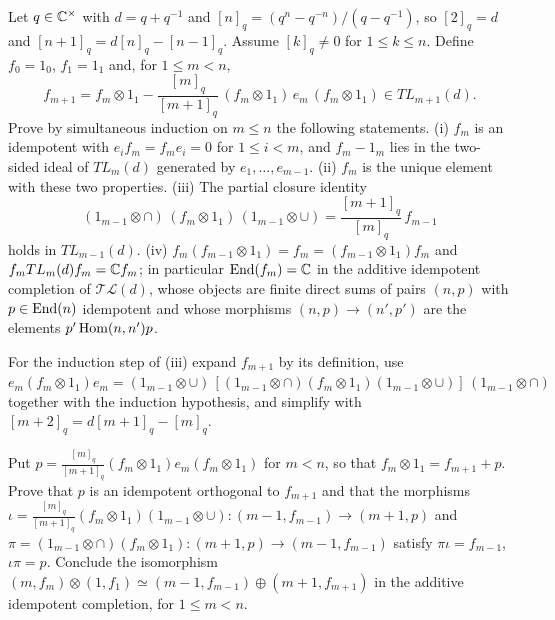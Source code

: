 \begin{exercise}
Let $q\in\mathbb C^\times$ with $d=q+q^{-1}$ and $[n]_q=(q^n-q^{-n})/(q-q^{-1})$, so $[2]_q=d$ and $[n+1]_q=d[n]_q-[n-1]_q$. Assume $[k]_q\ne0$ for $1\le k\le n$. Define $f_0=1_0$, $f_1=1_1$ and, for $1\le m<n$,
\[
f_{m+1}=f_m\otimes1_1-\frac{[m]_q}{[m+1]_q}\,(f_m\otimes1_1)\,e_m\,(f_m\otimes1_1)\in TL_{m+1}(d).
\]
Prove by simultaneous induction on $m\le n$ the following statements. (i) $f_m$ is an idempotent with $e_if_m=f_me_i=0$ for $1\le i<m$, and $f_m-1_m$ lies in the two-sided ideal of $TL_m(d)$ generated by $e_1,\dots,e_{m-1}$. (ii) $f_m$ is the unique element with these two properties. (iii) The partial closure identity
\[
(1_{m-1}\otimes\cap)\,(f_m\otimes1_1)\,(1_{m-1}\otimes\cup)=\frac{[m+1]_q}{[m]_q}\,f_{m-1}
\]
holds in $TL_{m-1}(d)$. (iv) $f_m(f_{m-1}\otimes1_1)=f_m=(f_{m-1}\otimes1_1)f_m$ and $f_mTL_m(d)f_m=\mathbb C f_m$; in particular $\operatorname{End}(f_m)=\mathbb C$ in the additive idempotent completion of $\mathcal{TL}(d)$, whose objects are finite direct sums of pairs $(n,p)$ with $p\in\operatorname{End}(n)$ idempotent and whose morphisms $(n,p)\to(n',p')$ are the elements $p'\operatorname{Hom}(n,n')p$.

For the induction step of (iii) expand $f_{m+1}$ by its definition, use $e_m(f_m\otimes 1_1)e_m=(1_{m-1}\otimes\cup)\,[(1_{m-1}\otimes\cap)(f_m\otimes1_1)(1_{m-1}\otimes\cup)]\,(1_{m-1}\otimes\cap)$ together with the induction hypothesis, and simplify with $[m+2]_q=d[m+1]_q-[m]_q$.

Put $p=\frac{[m]_q}{[m+1]_q}(f_m\otimes1_1)e_m(f_m\otimes1_1)$ for $m<n$, so that $f_m\otimes1_1=f_{m+1}+p$. Prove that $p$ is an idempotent orthogonal to $f_{m+1}$ and that the morphisms $\iota=\frac{[m]_q}{[m+1]_q}(f_m\otimes1_1)(1_{m-1}\otimes\cup)\colon(m-1,f_{m-1})\to(m+1,p)$ and $\pi=(1_{m-1}\otimes\cap)(f_m\otimes1_1)\colon(m+1,p)\to(m-1,f_{m-1})$ satisfy $\pi\iota=f_{m-1}$, $\iota\pi=p$. Conclude the isomorphism $(m,f_m)\otimes(1,f_1)\simeq(m-1,f_{m-1})\oplus(m+1,f_{m+1})$ in the additive idempotent completion, for $1\le m<n$.
\end{exercise}

